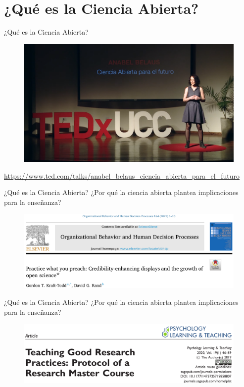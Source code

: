 \documentclass{beamer}
\begin{document}
\section{¿Qué es la Ciencia Abierta?}
\begin{frame}{¿Qué es la Ciencia Abierta?}
\begin{figure}
\includegraphics[width=.7\textwidth]{Anabela.png}
\end{figure}
\tiny
\textcolor{blue}{\url{https://www.ted.com/talks/anabel_belaus_ciencia_abierta_para_el_futuro}}
\end{frame}

\begin{frame}{¿Qué es la Ciencia Abierta?}
\large
¿Por qué la ciencia abierta plantea implicaciones para la enseñanza?
\begin{figure}
\includegraphics[width=.7\textwidth]{CA.png}
\end{figure}
\cite{Kraft2021}
\end{frame}

\begin{frame}{¿Qué es la Ciencia Abierta?}
\large
¿Por qué la ciencia abierta plantea implicaciones para la enseñanza?
\begin{figure}
\includegraphics[width=1\textwidth]{CAT.png}
\end{figure}
\cite{Sarafoglou2020}
\end{frame}
\end{document}
